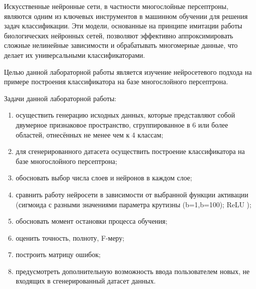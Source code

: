 
Искусственные нейронные сети, в частности многослойные персептроны, являются одним из ключевых инструментов в машинном обучении для решения задач классификации. Эти модели, основанные на принципе имитации работы биологических нейронных сетей, позволяют эффективно аппроксимировать сложные нелинейные зависимости и обрабатывать многомерные данные, что делает их универсальными классификаторами.

Целью данной лабораторной работы является изучение нейросетевого подхода на примере построения классификатора на базе многослойного персептрона.

Задачи данной лабораторной работы:
\begin{enumerate}[label*=\arabic*)]
	\item осуществить генерацию исходных данных, которые представляют собой двумерное признаковое пространство, сгруппированное в 6 или более областей, отнесённых не менее чем к 4 классам;
	\item для сгенерированного датасета осуществить построение классификатора на базе многослойного персептрона;
	\item обосновать выбор числа слоев и нейронов в каждом слое;
	\item сравнить работу нейросети в зависимости от выбранной функции активации (сигмоида с разными значениями параметра крутизны (b=1,b=100);  ReLU );
	\item обосновать момент остановки процесса обучения;
	\item оценить точность, полноту, F-меру;
	\item построить матрицу ошибок;
	\item предусмотреть дополнительную возможность ввода пользователем новых, не входящих в сгенерированный датасет данных.
\end{enumerate}

\clearpage
